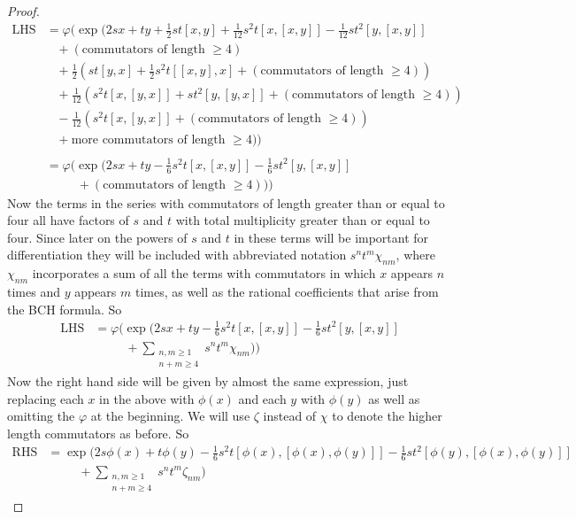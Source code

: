 \documentclass[honours]{UNSWthesis}
\newcommand{\1}{\mathbf{e}_{1}}
\newcommand{\2}{\mathbf{e}_{3}}
\newcommand{\3}{\mathbf{e}_{3}}
\begin{document}
\begin{proof}
\begin{align*}
\text{LHS} &= \varphi \bigg( \exp \bigg( 
2sx+ty+\frac{1}{2}st[x, y]+\frac{1}{12}s^{2}t[x,[x,y]] -\frac{1}{12}st^{2}[y,[x,y]] \\
&\;\;\;  +(\text{commutators of length $\geq 4$}) \\
&\;\;\; + \frac{1}{2}\left( st[y,x] + \frac{1}{2}s^{2}t[[x,y],x] +(\text{commutators of length $\geq 4$}) \right) \\
&\;\;\;+\frac{1}{12}\left( s^{2}t[x,[y,x]]+st^{2}[y,[y,x]] + (\text{commutators of length $\geq 4$}) \right) \\
&\;\;\;-\frac{1}{12}\left( s^{2}t[x,[y,x]] + (\text{commutators of length $\geq 4$}) \right) \\
&\;\;\;+ \text{more commutators of length $\geq 4$} \bigg) \bigg) \\
&\\
&= \varphi \bigg( \exp \bigg( 
2sx+ty-\frac{1}{6}s^{2}t[x,[x,y]] -\frac{1}{6}st^{2}[y,[x,y]] \\
&\;\;\;\;\;\;\;\;\;  +(\text{commutators of length $\geq 4$}) \bigg) \bigg)
\end{align*}
Now the terms in the series with commutators of length greater than or equal to four all have factors of $s$ and $t$ with total multiplicity greater than or equal to four. Since later on the powers of $s$ and $t$ in these terms will be important for differentiation they will be included with abbreviated notation $s^{n}t^{m}\chi_{nm}$, where $\chi_{nm}$ incorporates a sum of all the terms with commutators in which $x$ appears $n$ times and $y$ appears $m$ times, as well as the rational coefficients that arise from the BCH formula. So 
\begin{align*}
\text{LHS} &= \varphi \bigg( \exp \bigg( 
2sx+ty-\frac{1}{6}s^{2}t[x,[x,y]] -\frac{1}{6}st^{2}[y,[x,y]] \\
&\;\;\;\;\;\;\;\;\;  +\sum\limits_{\substack{n,m \geq 1  \\ n+m \geq 4}}s^{n}t^{m}\chi_{nm} \bigg) \bigg)
\end{align*}
Now the right hand side will be given by almost the same expression, just replacing each $x$ in the above with $\phi(x)$ and each $y$ with $\phi(y)$ as well as omitting the $\varphi$ at the beginning. We will use $\zeta$ instead of $\chi$ to denote the higher length commutators as before. So 
\begin{align*}
\text{RHS} &=  \exp \bigg( 
2s\phi(x)+t\phi(y)-\frac{1}{6}s^{2}t[\phi(x),[\phi(x),\phi(y)]] -\frac{1}{6}st^{2}[\phi(y),[\phi(x),\phi(y)]] \\
&\;\;\;\;\;\;\;\;\;  +\sum\limits_{\substack{n,m \geq 1  \\ n+m \geq 4}}s^{n}t^{m}\zeta_{nm} \bigg) 
\end{align*}


\end{proof}
\end{document}
